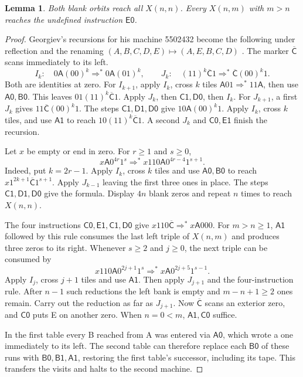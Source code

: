 \documentclass[11pt]{article}
\newtheorem{lemma}[theorem]{Lemma}
\newcommand{\state}[1]{\mathsf{#1}}
\newcommand{\run}{\mathrel{\Rightarrow^{*}}}
\newcommand{\Cleft}{\overline{\state C}}
\begin{document}
\begin{lemma}\label{invdiag}
Both blank orbits reach all \(X(n,n)\). Every \(X(n,m)\) with \(m>n\) reaches the undefined instruction \(\state{E0}\).
\end{lemma}
\begin{proof}
Georgiev's recursions for his machine 5502432 become the following under reflection and the renaming \((A,B,C,D,E)\mapsto(A,E,B,C,D)\) \cite{inverter}. The marker \(\Cleft\) scans immediately to its left.
\[
 I_k:\quad 0\state A(00)^k\run0\state A(01)^k,\qquad
 J_k:\quad (11)^k\Cleft1\run\Cleft(00)^k1 .
\]
Both are identities at zero. For \(I_{k+1}\), apply \(I_k\), cross \(k\) tiles \(\state A01\run11\state A\), then use \(\state{A0,B0}\). This leaves \(01(11)^k\Cleft1\). Apply \(J_k\), then \(\state{C1,D0}\), then \(I_k\). For \(J_{k+1}\), a first \(J_k\) gives \(11\Cleft(00)^k1\). The steps \(\state{C1,D1,D0}\) give \(10\state A(00)^k1\). Apply \(I_k\), cross \(k\) tiles, and use \(\state{A1}\) to reach \(10(11)^k\Cleft1\). A second \(J_k\) and \(\state{C0,E1}\) finish the recursion.

Let \(x\) be empty or end in zero. For \(r\ge1\) and \(s\ge0\),
\[
 x\state A0^{4r}1^s\run x110\state A0^{4r-4}1^{s+1}.
\]
Indeed, put \(k=2r-1\). Apply \(I_k\), cross \(k\) tiles and use \(\state{A0,B0}\) to reach \(x1^{2k+1}\Cleft1^{s+1}\). Apply \(J_{k-1}\) leaving the first three ones in place. The steps \(\state{C1,D1,D0}\) give the formula. Display \(4n\) blank zeros and repeat \(n\) times to reach \(X(n,n)\).

The four instructions \(\state{C0,E1,C1,D0}\) give \(x110\Cleft\run x\state A000\). For \(m>n\ge1\), \(\state{A1}\) followed by this rule consumes the last left triple of \(X(n,m)\) and produces three zeros to its right. Whenever \(s\ge2\) and \(j\ge0\), the next triple can be consumed by
\[
 x110\state A0^{2j+1}1^s\run x\state A0^{2j+5}1^{s-1}.
\]
Apply \(I_j\), cross \(j+1\) tiles and use \(\state{A1}\). Then apply \(J_{j+1}\) and the four-instruction rule. After \(n-1\) such reductions the left bank is empty and \(m-n+1\ge2\) ones remain. Carry out the reduction as far as \(J_{j+1}\). Now \(\Cleft\) scans an exterior zero, and \(\state{C0}\) puts E on another zero. When \(n=0<m\), \(\state{A1,C0}\) suffice.

In the first table every B reached from A was entered via \(\state{A0}\), which wrote a one immediately to its left. The second table can therefore replace each \(\state{B0}\) of these runs with \(\state{B0,B1,A1}\), restoring the first table's successor, including its tape. This transfers the visits and halts to the second machine.
\end{proof}
\end{document}
